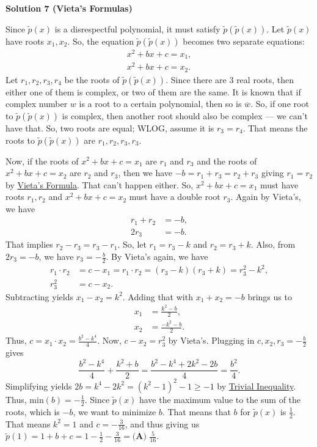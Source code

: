 \begin{enumerate}
 



\textbf{Solution 7 (Vieta’s Formulas)}

Since $\tilde{p}(x)$ is a disrespectful polynomial, it must satisfy $\tilde{p}(\tilde{p}(x))$. Let $\tilde{p}(x)$ have roots $x_1, x_2$. So, the equation $\tilde{p}(\tilde{p}(x))$ becomes two separate equations:
 \begin{align*} x^2+bx+c=x_1, \\ x^2+bx+c=x_2. \end{align*}
Let $r_1,r_2,r_3,r_4$ be the roots of $\tilde{p}(\tilde{p}(x))$. Since there are $3$ real roots, then either one of them is complex, or two of them are the same. It is known that if complex number $w$ is a root to a certain polynomial, then so is $\overline{w}$. So, if one root to $\tilde{p}(\tilde{p}(x))$ is complex, then another root should also be complex — we can't have that. So, two roots are equal; WLOG, assume it is $r_3=r_4$. That means the roots to $\tilde{p}(\tilde{p}(x))$ are $r_1,r_2,r_3,r_3$.

 Now, if the roots of $x^2+bx+c=x_1$ are $r_1$ and $r_3$ and the roots of $x^2+bx+c=x_2$ are $r_2$ and $r_3$, then we have $-b = r_1+r_3 = r_2+r_3$ giving $r_1=r_2$ by \href{https://artofproblemsolving.com/wiki/index.php?title=Vieta\%27s\_Formula}{Vieta's Formula}. That can't happen either. So, $x^2+bx+c=x_1$ must have roots $r_1, r_2$ and $x^2+bx+c=x_2$ must have a double root $r_3$. Again by Vieta's, we have
 \begin{align*} r_1+r_2&=-b, \\ 2r_3&=-b. \end{align*}
That implies $r_2-r_3=r_3-r_1$. So, let $r_1=r_3-k$ and $r_2=r_3+k$. Also, from $2r_3=-b$, we have $r_3=-\frac{b}{2}$. By Vieta's again, we have
 \begin{align*} r_1\cdot r_2 &= c-x_1 = r_1\cdot r_2 = (r_3-k)(r_3+k) = r_3^2-k^2, \\ r_3^2&=c-x_2. \end{align*}
Subtracting yields $x_1-x_2=k^2$. Adding that with $x_1+x_2=-b$ brings us to
 \begin{align*} x_1 &= \frac{k^2-b}{2}, \\ x_2 &= \frac{-k^2-b}{2}. \end{align*}
Thus, $c=x_1\cdot x_2=\frac{b^2-k^4}{4}$. Now, $c-x_2 = r_3^2$ by Vieta's. Plugging in $c, x_2, r_3=-\frac{b}{2}$ gives
 \[\frac{b^2-k^4}{4} + \frac{k^2+b}{2} = \frac{b^2-k^4+2k^2-2b}{4} = \frac{b^2}{4}.\]Simplifying yields $2b=k^4-2k^2=(k^2-1)^2-1 \ge -1$ by \href{https://artofproblemsolving.com/wiki/index.php?title=Trivial\_Inequality}{Trivial Inequality}. Thus, $\text{min}(b) = -\frac{1}{2}$. Since $\tilde{p}(x)$ have the maximum value to the sum of the roots, which is $-b$, we want to minimize $b$. That means that $b$ for $\tilde{p}(x)$ is $\frac{1}{2}$. That means $k^2=1$ and $c=-\frac{3}{16}$, and thus giving us $\tilde{p}(1) = 1+b+c = 1-\frac{1}{2}-\frac{3}{16} = \boxed{\textbf{(A) } \frac{5}{16}}$.


\end{enumerate}
